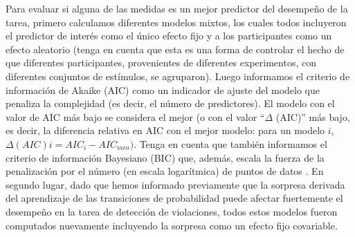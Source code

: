 
Para evaluar si alguna de las medidas es un mejor predictor del desempeño de la tarea, primero calculamos diferentes modelos mixtos, los cuales todos incluyeron el predictor de interés como el único efecto fijo y a los participantes como un efecto aleatorio (tenga en cuenta que esta es una forma de controlar el hecho de que diferentes participantes, provenientes de diferentes experimentos, con diferentes conjuntos de estímulos, se agruparon). Luego informamos el criterio de información de Akaike (AIC) como un indicador de ajuste del modelo que penaliza la complejidad (es decir, el número de predictores). El modelo con el valor de AIC más bajo se considera el mejor (o con el valor ``$\Delta$ (AIC)'' más bajo, es decir, la diferencia relativa en AIC con el mejor modelo: para un modelo $i$, $\Delta (AIC) i = AIC_i - AIC_{min})$. Tenga en cuenta que también informamos el criterio de información Bayesiano (BIC) que, además, escala la fuerza de la penalización por el número (en escala logarítmica) de puntos de datos \cite{f105}. En segundo lugar, dado que hemos informado previamente que la sorpresa derivada del aprendizaje de las transiciones de probabilidad puede afectar fuertemente el desempeño en la tarea de detección de violaciones, todos estos modelos fueron computados nuevamente incluyendo la sorpresa como un efecto fijo covariable.

